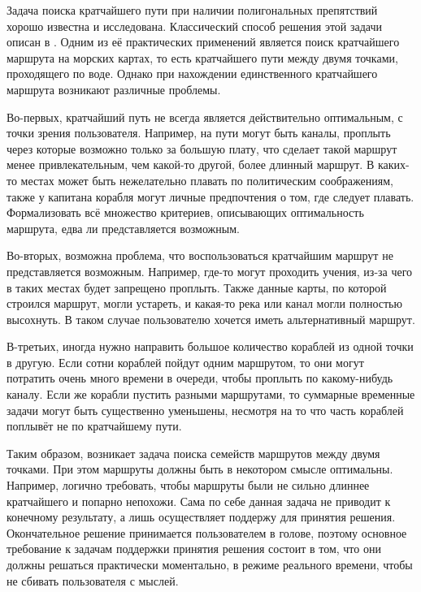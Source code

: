 \startprefacepage

Задача поиска кратчайшего пути при наличии полигональных препятствий
хорошо известна и исследована. Классический способ решения этой задачи
описан в \cite{deBerg}. Одним из её практических применений является
поиск кратчайшего маршрута на морских картах, то есть кратчайшего пути
между двумя точками, проходящего по воде. Однако при нахождении
единственного кратчайшего маршрута возникают различные проблемы.

Во-первых, кратчайший путь не всегда является действительно
оптимальным, с точки зрения пользователя. Например, на пути могут быть
каналы, проплыть через которые возможно только за большую плату, что
сделает такой маршрут менее привлекательным, чем какой-то другой,
более длинный маршрут. В каких-то местах может быть нежелательно
плавать по политическим соображениям, также у капитана корабля могут
личные предпочтения о том, где следует плавать. Формализовать всё
множество критериев, описывающих оптимальность маршрута, едва ли
представляется возможным.

Во-вторых, возможна проблема, что воспользоваться кратчайшим маршрут
не представляется возможным. Например, где-то могут проходить учения,
из-за чего в таких местах будет запрещено проплыть. Также данные
карты, по которой строился маршрут, могли устареть, и какая-то река
или канал могли полностью высохнуть. В таком случае пользователю
хочется иметь альтернативный маршрут.

В-третьих, иногда нужно направить большое количество кораблей из одной
точки в другую. Если сотни кораблей пойдут одним маршрутом, то они
могут потратить очень много времени в очереди, чтобы проплыть по
какому-нибудь каналу. Если же корабли пустить разными маршрутами, то
суммарные временные задачи могут быть существенно уменьшены, несмотря
на то что часть кораблей поплывёт не по кратчайшему пути.

Таким образом, возникает задача поиска семейств маршрутов между двумя
точками. При этом маршруты должны быть в некотором смысле оптимальны.
Например, логично требовать, чтобы маршруты были не сильно длиннее
кратчайшего и попарно непохожи. Сама по себе данная задача не приводит
к конечному результату, а лишь осуществляет поддержу для принятия
решения. Окончательное решение принимается пользователем в голове,
поэтому основное требование к задачам поддержки принятия решения
состоит в том, что они должны решаться практически моментально, в
режиме реального времени, чтобы не сбивать пользователя с мыслей.

